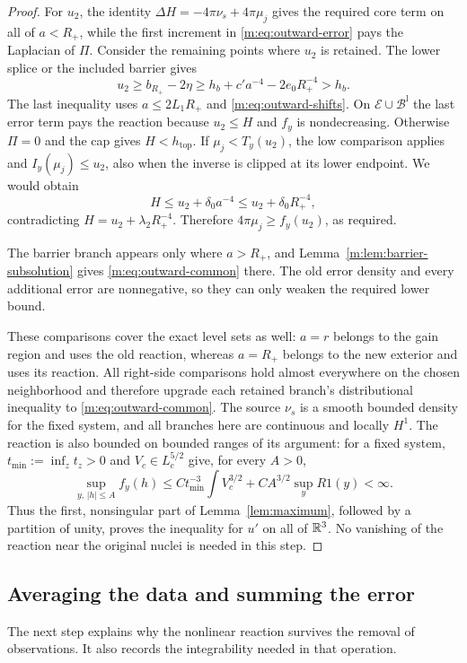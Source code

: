 \begin{proof}
For $u_2$, the identity $\Delta H=-4\pi\nu_s+4\pi\mu_j$ gives the required
core term on all of $a<R_+$, while the first increment in
\eqref{m:eq:outward-error} pays the Laplacian of $\Pi$.  Consider the remaining
points where $u_2$ is retained.  The lower splice or the included barrier gives
\[
 u_2\ge b_{R_+}-2\eta
       \ge h_b+c'a^{-4}-2e_0R_+^{-4}>h_b.
\]
The last inequality uses $a\le2L_1R_+$ and
\eqref{m:eq:outward-shifts}.  On
$\mathcal E\cup\mathcal B^{\mathrm l}$ the last error term pays the
reaction because $u_2\le H$ and $f_y$ is nondecreasing.  Otherwise $\Pi=0$
and the cap gives $H<h_{\mathrm{top}}$.  If $\mu_j<T_y(u_2)$, the low
comparison applies and $I_y(\mu_j)\le u_2$, also when the inverse is clipped
at its lower endpoint.  We would obtain
\[
 H\le u_2+\delta_0a^{-4}\le u_2+\delta_0R_+^{-4},
\]
contradicting $H=u_2+\lambda_2R_+^{-4}$.  Therefore
$4\pi\mu_j\ge f_y(u_2)$, as required.

The barrier branch appears only where $a>R_+$, and
Lemma~\ref{m:lem:barrier-subsolution} gives \eqref{m:eq:outward-common} there.
The old error density and every additional error are nonnegative, so they
can only weaken the required lower bound.

These comparisons cover the exact level sets as well: $a=r$ belongs to the
gain region and uses the old reaction, whereas $a=R_+$ belongs to the new
exterior and uses its reaction.  All right-side comparisons hold almost
everywhere on the chosen neighborhood and therefore upgrade each retained
branch's distributional inequality to \eqref{m:eq:outward-common}.
The source $\nu_s$ is a smooth bounded density for the fixed system,
and all branches here are continuous and locally $H^1$. The reaction
is also bounded on bounded ranges of its argument: for a fixed system,
$t_{\min}:=\inf_z t_z>0$ and $V_c\in L_c^{5/2}$ give, for every $A>0$,
\[
 \sup_{y,\,|h|\le A} f_y(h)
 \le C t_{\min}^{-3}\int V_c^{3/2}
       +CA^{3/2}\sup_y R1(y)<\infty.
\]
Thus the first,
nonsingular part of Lemma~\ref{lem:maximum}, followed by a partition
of unity, proves the inequality for $u'$ on all of $\mathbb R^3$. No vanishing
of the reaction near the original nuclei is needed in this step.
\end{proof}

\subsection{Averaging the data and summing the error}

The next step explains why the nonlinear reaction survives the removal of
observations.  It also records the integrability needed in that operation.

